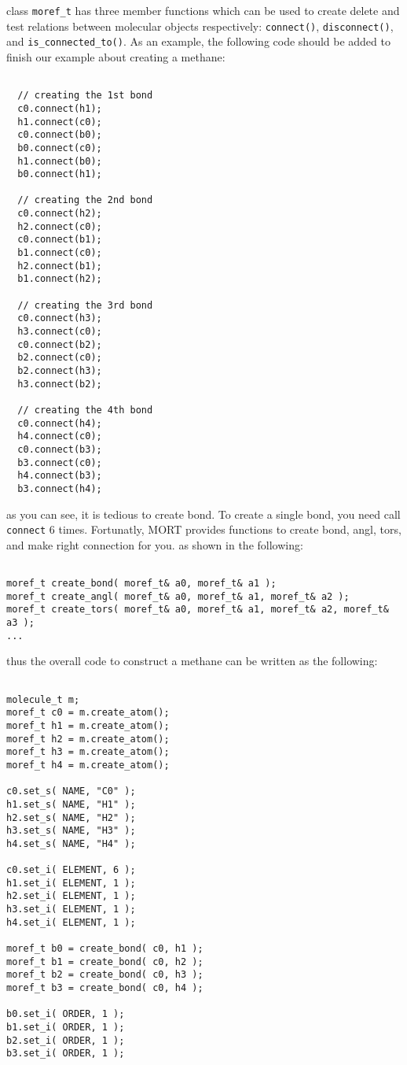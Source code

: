 \documentclass[letterpaper]{book}
\begin{document}
  class \lstinline$moref_t$ has three member functions which can be used to create delete and test relations 
between molecular objects respectively: \lstinline$connect()$, \lstinline$disconnect()$, and \lstinline$is_connected_to()$. 
As an example, the following code should be added to finish our example about creating a methane:

\begin{lstlisting}

  // creating the 1st bond
  c0.connect(h1);
  h1.connect(c0);
  c0.connect(b0);
  b0.connect(c0);
  h1.connect(b0);
  b0.connect(h1);

  // creating the 2nd bond
  c0.connect(h2);
  h2.connect(c0);
  c0.connect(b1);
  b1.connect(c0);
  h2.connect(b1);
  b1.connect(h2);

  // creating the 3rd bond
  c0.connect(h3);
  h3.connect(c0);
  c0.connect(b2);
  b2.connect(c0);
  b2.connect(h3);
  h3.connect(b2);

  // creating the 4th bond
  c0.connect(h4);
  h4.connect(c0);
  c0.connect(b3);
  b3.connect(c0);
  h4.connect(b3);
  b3.connect(h4);

\end{lstlisting}

as you can see, it is tedious to create bond. To create a single bond, you need call \lstinline$connect$
6 times. Fortunatly, MORT provides functions to create bond, angl, tors, and make right connection for you. 
as shown in the following:

\begin{lstlisting}

moref_t create_bond( moref_t& a0, moref_t& a1 );
moref_t create_angl( moref_t& a0, moref_t& a1, moref_t& a2 );
moref_t create_tors( moref_t& a0, moref_t& a1, moref_t& a2, moref_t& a3 );
...
\end{lstlisting}

thus the overall code to construct a methane can be written as the following:

\begin{lstlisting}

molecule_t m;
moref_t c0 = m.create_atom();
moref_t h1 = m.create_atom();
moref_t h2 = m.create_atom();
moref_t h3 = m.create_atom();
moref_t h4 = m.create_atom();

c0.set_s( NAME, "C0" );
h1.set_s( NAME, "H1" );
h2.set_s( NAME, "H2" );
h3.set_s( NAME, "H3" );
h4.set_s( NAME, "H4" );

c0.set_i( ELEMENT, 6 );
h1.set_i( ELEMENT, 1 );
h2.set_i( ELEMENT, 1 );
h3.set_i( ELEMENT, 1 );
h4.set_i( ELEMENT, 1 );

moref_t b0 = create_bond( c0, h1 );
moref_t b1 = create_bond( c0, h2 );
moref_t b2 = create_bond( c0, h3 );
moref_t b3 = create_bond( c0, h4 );

b0.set_i( ORDER, 1 );
b1.set_i( ORDER, 1 );
b2.set_i( ORDER, 1 );
b3.set_i( ORDER, 1 );

\end{lstlisting}
\end{document}
